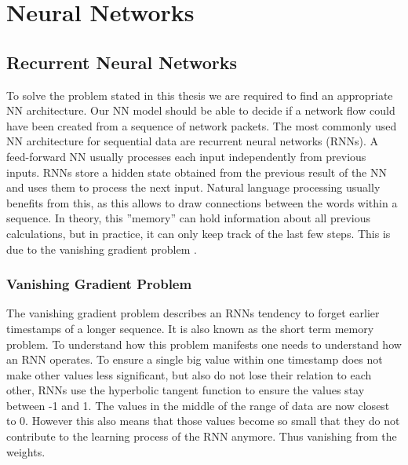 \documentclass[
	ngerman,
	ruledheaders=section,%
	class=report,%
	thesis={type=bachelor},%
	accentcolor=9c,%
	custommargins=true,%
	marginpar=false,%
	parskip=half-,%
	fontsize=11pt,%
]{tudapub}
\begin{document}


\section{Neural Networks}
\label{sec:NNbackground}


\subsection{Recurrent Neural Networks}
\label{sec:RNN}

To solve the problem stated in this thesis we are required to find an appropriate NN architecture.
Our NN model should be able to decide if a network flow could have been created from a sequence of network packets.
The most commonly used NN architecture for sequential data are recurrent neural networks (RNNs).
A feed-forward NN usually processes each input independently from previous inputs.
RNNs store a hidden state obtained from the previous result of the NN and uses them to process the next input.
Natural language processing usually benefits from this, as this allows to draw connections between the words within a sequence.
In theory, this ''memory'' can hold information about all previous calculations,
but in practice, it can only keep track of the last few steps.
This is due to the vanishing gradient problem \cite{hochreiterLongShortTermMemory1997}.

\subsubsection{Vanishing Gradient Problem}
\label{sec:vanishing}

The vanishing gradient problem describes an RNNs tendency to forget earlier timestamps of a longer sequence.
It is also known as the short term memory problem.
To understand how this problem manifests one needs to understand how an RNN operates.
To ensure a single big value within one timestamp does not make other values less significant, but also do not lose their relation to each other, RNNs use the hyperbolic tangent function to ensure the values stay between -1 and 1.
The values in the middle of the range of data are now closest to 0.
However this also means that those values become so small that they do not contribute to the learning process of the RNN anymore.
Thus vanishing from the weights.
\end{document}
